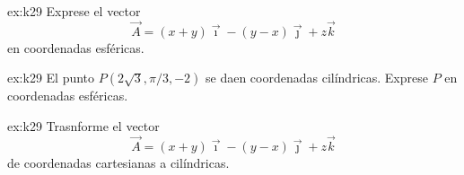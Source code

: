 \begin{multicols}{2}
    \begin{excercise}[][][$\vec{A}=R\vec{e}_R-R\sin{\phi}\vec{e}_\theta$]{ex:k29}{ 
            Exprese el vector 
            \begin{equation*}
                \vec{A}=(x+y)\vec{\imath}-(y-x)\vec{\jmath} +z\vec{k}
            \end{equation*}
            en coordenadas esféricas.
        }
    \end{excercise}

    \begin{excercise}[][][$P=P(4, 2\pi/3, \pi/3)$]{ex:k29}{ 
            El punto $P(2\sqrt{3},\pi/3, -2)$ se daen coordenadas cilíndricas. Exprese $P$ en coordenadas esféricas.        
        }
    \end{excercise}

    \begin{excercise}[][][$\vec{A}=R\vec{e}_R-R\sin{\phi}\vec{e}_\theta$]{ex:k29}{ 
            Trasnforme el vector 
            \begin{equation*}
                \vec{A}=(x+y)\vec{\imath}-(y-x)\vec{\jmath} +z\vec{k}
            \end{equation*}
            de coordenadas cartesianas a cilíndricas.
        }
    \end{excercise}
\end{multicols}
